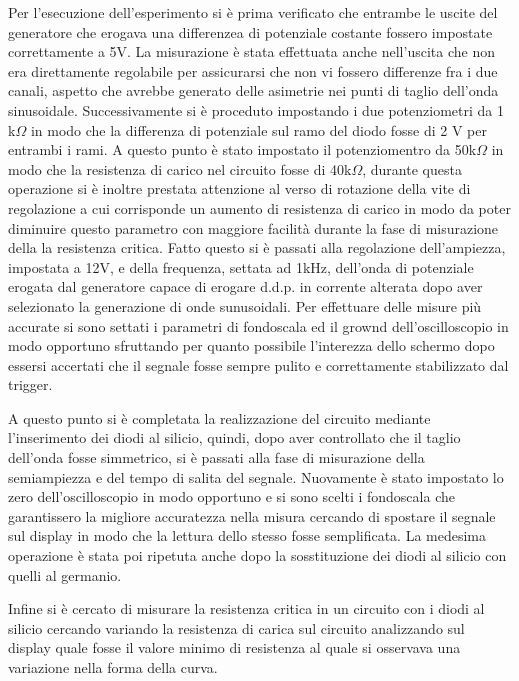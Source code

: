 \documentclass[a4paper,11pt]{article}
\begin{document}
Per l'esecuzione dell'esperimento si è prima verificato che entrambe le uscite del generatore che erogava una differenzea di potenziale costante fossero impostate correttamente a 5V.
La misurazione è stata effettuata anche nell'uscita che non era direttamente regolabile per assicurarsi che non vi fossero differenze fra i due canali, aspetto che avrebbe generato delle asimetrie nei punti di taglio dell'onda sinusoidale. 
 Successivamente si è proceduto impostando i due potenziometri da 1 k$\Omega$ in modo che la differenza di potenziale sul ramo del diodo fosse di 2 V per entrambi i rami.  A questo punto è stato impostato il potenziomentro da 50k$\Omega$ in modo che la resistenza di carico nel circuito fosse di 40k$\Omega$, durante questa operazione si è inoltre prestata attenzione al verso di rotazione della vite di regolazione a cui corrisponde un aumento di resistenza di carico in modo da poter diminuire questo parametro con maggiore facilità durante la fase di misurazione della la resistenza critica. 
 Fatto questo si è passati alla regolazione dell'ampiezza, impostata a 12V, e della frequenza, settata ad 1kHz, dell'onda di potenziale erogata dal generatore capace di erogare d.d.p. in corrente alterata dopo aver selezionato la generazione di onde sunusoidali. Per effettuare delle misure più accurate si sono settati i parametri di fondoscala ed il grownd dell'oscilloscopio in modo opportuno sfruttando per quanto possibile l'interezza dello schermo dopo essersi accertati che il segnale fosse sempre pulito e correttamente stabilizzato dal trigger.
 
A questo punto si è completata la realizzazione del circuito mediante l'inserimento dei diodi al silicio, quindi, dopo aver controllato che il taglio dell'onda fosse simmetrico, si è passati alla fase di misurazione della semiampiezza e del tempo di salita del segnale. Nuovamente è stato impostato lo zero dell'oscilloscopio in modo opportuno e si sono scelti i fondoscala che garantissero la migliore accuratezza nella misura cercando di spostare il segnale sul display in modo che la lettura dello stesso fosse semplificata. La medesima operazione è stata poi ripetuta anche dopo la sosstituzione dei diodi al silicio con quelli al germanio. 

Infine si è cercato di misurare la resistenza critica in un circuito con i diodi al silicio cercando variando la resistenza di carica sul circuito analizzando sul display quale fosse il valore minimo di resistenza al quale si osservava una variazione nella forma della curva.
\end{document}
